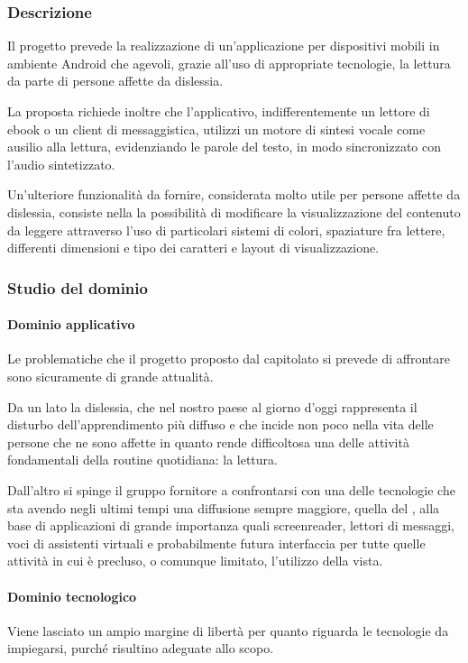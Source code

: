 		\subsubsection{Descrizione}
		Il progetto prevede la realizzazione di un'applicazione per dispositivi mobili in ambiente Android che agevoli, grazie all'uso di appropriate tecnologie, la lettura da parte di persone affette da dislessia.

		La proposta richiede inoltre che l'applicativo, indifferentemente un lettore di ebook o un client di messaggistica, utilizzi un motore di sintesi vocale come ausilio alla lettura, evidenziando le parole del testo, in modo sincronizzato con l'audio sintetizzato. 

		Un'ulteriore funzionalità da fornire, considerata molto utile per persone affette da dislessia, consiste nella la possibilità di modificare la visualizzazione del contenuto da leggere attraverso l'uso di particolari sistemi di colori, spaziature fra lettere, differenti dimensioni 
		e tipo dei caratteri e layout di visualizzazione.
		\subsubsection{Studio del dominio}
			\paragraph{Dominio applicativo}
			Le problematiche che il progetto proposto dal capitolato si prevede di affrontare sono sicuramente di grande attualità.

			Da un lato la dislessia, che nel nostro paese al giorno d'oggi rappresenta il disturbo dell'apprendimento più diffuso e che incide non poco nella vita delle persone che ne sono affette in quanto rende difficoltosa una delle attività fondamentali della routine quotidiana: la lettura. 

			Dall'altro si spinge il gruppo fornitore a confrontarsi con una delle tecnologie che sta avendo negli ultimi tempi una diffusione sempre maggiore, quella del , alla base di applicazioni di grande importanza quali screenreader, lettori di messaggi, voci di assistenti virtuali e probabilmente futura interfaccia per tutte quelle attività in cui è precluso, o comunque limitato, l'utilizzo della vista.
			\paragraph{Dominio tecnologico}
			Viene lasciato un ampio margine di libertà per quanto riguarda le tecnologie da impiegarsi, purché risultino adeguate allo scopo. 

